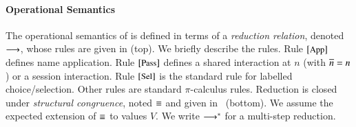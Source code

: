 \documentclass[preprint,11pt]{elsarticle}
\begin{document}


\paragraph{Operational Semantics}
The  operational semantics of \HOp is defined in terms of a \emph{reduction relation}, 
denoted $\longrightarrow$, whose rules are
given in 
  (top).
 We briefly describe the rules. 
Rule ${\scriptsize{[\textrm{\small App}]}}$ defines  name application.
Rule ${\scriptsize{[\textrm{\small Pass}]}}$ defines a shared interaction at $n$ 
(with $\overline{n}=n$) or a session interaction.
Rule ${\scriptsize{[\textrm{\small Sel}]}}$ is the standard rule for labelled choice/selection. %
Other rules are standard $\pi$-calculus rules.
Reduction is closed under \emph{structural congruence}, 
noted $\equiv$ and given in ~(bottom). 
We assume the expected extension of $\equiv$ to values $V$.
We write $\longrightarrow^\ast$ for a multi-step reduction.


\end{document}
